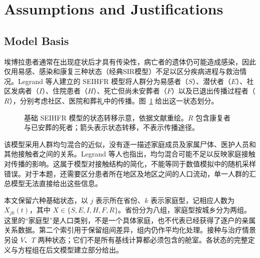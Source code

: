 \section{Assumptions and Justifications}
\label{sec:assumptions}

\subsection{Model Basis}

埃博拉患者通常在出现症状后才具有传染性，病亡者的遗体仍可能造成感染，因此仅用易感、感染和康复三种状态（经典SIR模型）不足以区分疾病进程与救治情况\cite{whofactsheet}。Legrand 等人建立的 SEIHFR 模型将人群分为易感者（$S$）、潜伏者（$E$）、社区发病者（$I$）、住院患者（$H$）、死亡但尚未安葬者（$F$）以及已退出传播过程者（$R$），分别考虑社区、医院和葬礼中的传播\cite{legrand2007}。图~\ref{fig:seihfr-basis} 给出这一状态划分。

\begin{figure}[htbp]
\centering
{}
\caption{基础 SEIHFR 模型的状态转移示意，依据文献\cite{legrand2007}重绘。$R$ 包含康复者与已安葬的死者；箭头表示状态转移，不表示传播途径。}
\label{fig:seihfr-basis}
\end{figure}

该模型采用人群均匀混合的近似，没有逐一描述家庭成员及家属尸体、医护人员和其他接触者之间的关系。Legrand 等人也指出，均匀混合可能不足以反映家庭接触对传播的影响\cite{legrand2007}。这属于模型对接触结构的简化，不能等同于数值模拟中的随机采样错误。对于本题，还需要区分患者所在地区及地区之间的人口流动，单一人群的汇总模型无法直接给出这些信息。

本文保留六种基础状态，以 $j$ 表示所在省份、$k$ 表示家庭型，记相应人数为 $X_{jk}(t)$，其中 $X\in\{S,E,I,H,F,R\}$。省份分为八组，家庭型按城乡分为两组。这里的“家庭型”是人口类别，不是一个具体家庭，也不代表已经获得了逐户的亲属关系数据。第二个索引用于保留组间差异，组内仍作平均化处理。接种与治疗情景另设 $V$、$T$ 两种状态；它们不是所有基线计算都必须包含的舱室。各状态的完整定义与方程组在后文模型建立部分给出。

